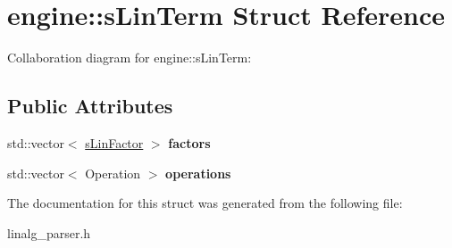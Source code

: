 \hypertarget{structengine_1_1sLinTerm}{\section{engine\-:\-:s\-Lin\-Term Struct Reference}
\label{structengine_1_1sLinTerm}
}


Collaboration diagram for engine\-:\-:s\-Lin\-Term\-:
\subsection*{Public Attributes}
\begin{DoxyCompactItemize}
\item 
\hypertarget{structengine_1_1sLinTerm_aee91b1a7819241c20825afa6a3ee4084}{std\-::vector$<$ \hyperlink{structengine_1_1sLinFactor}{s\-Lin\-Factor} $>$ {\bfseries factors}}\label{structengine_1_1sLinTerm_aee91b1a7819241c20825afa6a3ee4084}

\item 
\hypertarget{structengine_1_1sLinTerm_a3c3cb87999a21f0db665b42fdcd98ca2}{std\-::vector$<$ Operation $>$ {\bfseries operations}}\label{structengine_1_1sLinTerm_a3c3cb87999a21f0db665b42fdcd98ca2}

\end{DoxyCompactItemize}


The documentation for this struct was generated from the following file\-:\begin{DoxyCompactItemize}
\item 
linalg\-\_\-parser.\-h\end{DoxyCompactItemize}

